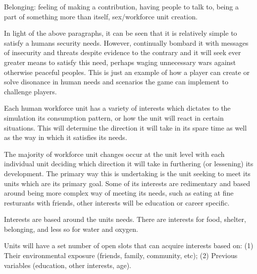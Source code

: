 Belonging: feeling of making a contribution, having people to talk to, being a part of something more than itself, sex/workforce unit creation.



In light of the above paragraphs, it can be seen that it is relatively simple to satisfy a humans security needs. However, continually bombard it with messages of insecurity and threats despite evidence to the contrary and it will seek ever greater means to satisfy this need, perhaps waging unnecessary wars against otherwise peaceful peoples. This is just an example of how a player can create or solve disonance in human needs and scenarios the game can implement to challenge players.










Each human workforce unit has a variety of interests which dictates to the simulation its consumption pattern, or how the unit will react in certain situations. This will determine the direction it will take in its spare time as well as the way in which it satisfies its needs. 

The majority of workforce unit changes occur at the unit level with each individual unit deciding which direction it will take in furthering (or lessening) its development. The primary way this is undertaking is the unit seeking to meet its units which are its primary goal. Some of its interests are redimentary and based around being more complex way of meeting its needs, such as eating at fine resturants with friends, other interests will be education or career specific. 

Interests are based around the units needs. There are interests for food, shelter, belonging, and less so for water and oxygen.

Units will have a set number of open slots that can acquire interests based on: (1) Their environmental exposure (friends, family, community, etc); (2) Previous variables (education, other interests, age).


